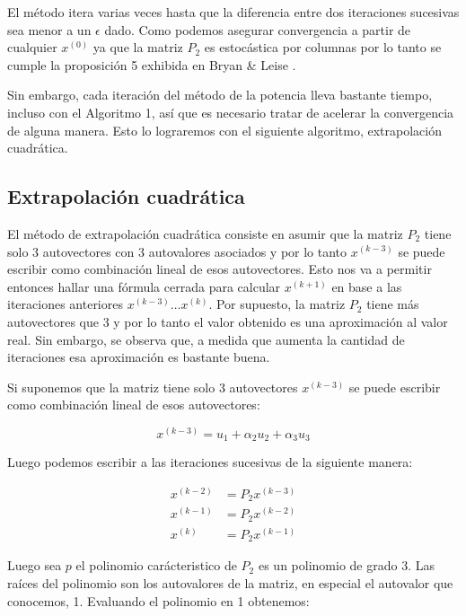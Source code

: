 \vspace{0.5cm}

El m\'etodo itera varias veces hasta que la diferencia entre dos iteraciones sucesivas sea menor a un $\epsilon$ dado. Como podemos asegurar convergencia a partir de cualquier $x^{(0)}$ ya que la matriz $P_{2}$ es estoc\'astica por columnas por lo tanto se cumple la proposici\'on 5  exhibida en Bryan \& Leise \cite[Secci\'on 4]{Bryan2006}.

Sin embargo, cada iteraci\'on del m\'etodo de la potencia lleva bastante tiempo, incluso con el Algoritmo 1, as\'i que es necesario tratar de acelerar la convergencia de alguna manera. Esto lo lograremos con el siguiente algoritmo, extrapolaci\'on cuadr\'atica.


\subsection{Extrapolaci\'on cuadr\'atica}

El m\'etodo de extrapolaci\'on cuadr\'atica \cite[Secci\'on 4]{Kamvar2003}consiste en asumir que la matriz $P_{2}$ tiene solo 3 autovectores con 3 autovalores asociados y por lo tanto $x^{(k-3)}$ se puede escribir como combinaci\'on lineal de esos autovectores. Esto nos va a permitir entonces hallar una f\'ormula cerrada para calcular $x^{(k+1)}$ en base a las iteraciones anteriores $x^{(k-3)} \dots x^{(k)}$. Por supuesto, la matriz $P_{2}$ tiene m\'as autovectores que 3 y por lo tanto el valor obtenido es una aproximaci\'on al valor real. Sin embargo, se observa que, a medida que aumenta la cantidad de iteraciones esa aproximaci\'on es bastante buena.

Si suponemos que la matriz tiene solo 3 autovectores $x^{(k-3)}$ se puede escribir como combinaci\'on lineal de esos autovectores:

\[
	x^{(k-3)} = u_{1} + \alpha_{2}u_{2} + \alpha_{3}u_{3}
\]

Luego podemos escribir a las iteraciones sucesivas de la siguiente manera:

\begin{align*}
	x^{(k-2)} &= P_{2}x^{(k-3)}\\
	x^{(k-1)} &= P_{2}x^{(k-2)}\\
	x^{(k)} &= P_{2}x^{(k-1)}
\end{align*}

Luego sea $p$ el polinomio car\'acteristico de $P_{2}$ es un polinomio de grado 3. Las ra\'ices del polinomio son los autovalores de la matriz, en especial el autovalor que conocemos, 1. Evaluando el polinomio en 1 obtenemos:


